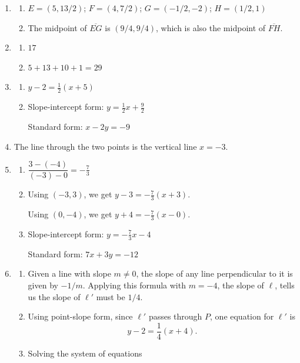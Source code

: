 \begin{enumerate}
\item \begin{enumerate}
\item $E = (5, 13/2)$; $F = (4, 7/2)$; $G = (-1/2, -2)$; $H = (1/2,1)$
\item The midpoint of $\overline{EG}$ is $(9/4, 9/4)$, which is also the midpoint of $\overline{FH}$.
\end{enumerate}
\item \begin{enumerate}
\item $\boxed{17}$
\item $5 + 13 + 10 + 1 = \boxed{29}$
\end{enumerate}
\item \begin{enumerate}
\item $y - 2 = \frac{1}{2}(x + 5)$
\item Slope-intercept form: $y = \frac{1}{2}x + \frac{9}{2}$\par
Standard form: $x - 2y = -9$
\end{enumerate}
\item The line through the two points is the vertical line $\boxed{x = -3}$.
\item \begin{enumerate}
\item $\dfrac{3 - (-4)}{(-3) - 0} = \boxed{-\frac{7}{3}}$
\item Using $(-3,3)$, we get $\boxed{y - 3 = -\frac{7}{3}(x + 3)}$.\par 
Using $(0, -4)$, we get $\boxed{y + 4 = -\frac{7}{3}(x - 0)}$.
\item Slope-intercept form: $\boxed{y = -\frac{7}{3}x - 4}$\par 
Standard form: $\boxed{7x + 3y = -12}$
\end{enumerate}
\item \begin{enumerate}
\item Given a line with slope $m\neq 0$, the slope of any line perpendicular to it is given by $-1/m$. Applying this formula with $m = -4$, the slope of $\ell$, tells us the slope of $\ell'$ must be $\boxed{1/4}$.
\item Using point-slope form, since $\ell'$ passes through $P$, one equation for $\ell'$ is 
\begin{equation*}
\boxed{y - 2 = \frac{1}{4}(x + 4)}.
\end{equation*}
\item Solving the system of equations

\end{enumerate}
\end{enumerate}
